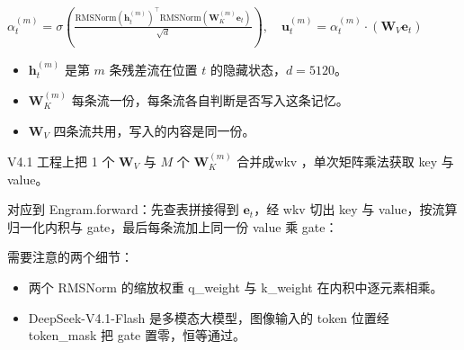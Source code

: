 \documentclass[zihao=false,fontset=windows]{ctexart}
\newcommand{\incode}[1]{\colorbox{inlinebg}{\ttfamily\small #1}}
\newcommand{\bigmath}[1]{%
  \begin{center}\large$\displaystyle #1$\end{center}%
}
\begin{document}
\bigmath{\alpha_t^{(m)}=\sigma\left(\frac{\mathrm{RMSNorm}(\mathbf{h}_t^{(m)})^\top\mathrm{RMSNorm}(\mathbf{W}_K^{(m)}\mathbf{e}_t)}{\sqrt{d}}\right),\quad\mathbf{u}_t^{(m)}=\alpha_t^{(m)}\cdot(\mathbf{W}_V\mathbf{e}_t)}
\begin{itemize}
\item 
$\mathbf{h}_t^{(m)}$ 是第 $m$ 条残差流在位置 $t$ 的隐藏状态，$d=5120$。\par
\item 
$\mathbf{W}_K^{(m)}$ 每条流一份，每条流各自判断是否写入这条记忆。\par
\item 
$\mathbf{W}_V$ 四条流共用，写入的内容是同一份。\par
\end{itemize}

\begin{feishuquote}

V4.1 工程上把 1 个 $\mathbf{W}_V$ 与 $M$ 个 $\mathbf{W}_K^{(m)}$ 合并成\incode{wkv} ，单次矩阵乘法获取 \incode{key} 与 \incode{value}。\par
\end{feishuquote}

对应到 \incode{Engram.forward}：先查表拼接得到 $\mathbf{e}_t$，经 \incode{wkv} 切出 \incode{key} 与 \incode{value}，按流算归一化内积与 gate，最后每条流加上同一份 value 乘 gate：\par


需要注意的两个细节：\par
\begin{itemize}
\item 
两个 RMSNorm 的缩放权重 \incode{q\_weight} 与 \incode{k\_weight} 在内积中逐元素相乘。\par
\item 
DeepSeek-V4.1-Flash 是多模态大模型，图像输入的 token 位置经 \incode{token\_mask} 把 gate 置零，恒等通过。\par
\end{itemize}
\end{document}
